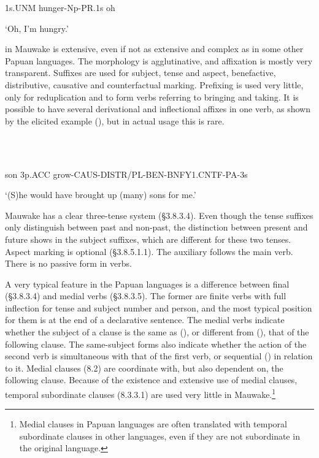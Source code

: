 1s.UNM  hunger-Np-PR.1s  oh

`Oh, I'm hungry.'

 in Mauwake is extensive, even if not as extensive and complex as in some other Papuan languages. The morphology is agglutinative, and  affixation is mostly very transparent.  Suffixes are used for subject, tense and aspect, benefactive, distributive, causative and counterfactual marking. Prefixing is used very little, only for reduplication and to form verbs referring to bringing and taking. It is possible to have several derivational and inflectional affixes in one verb, as shown by the elicited example (), but in actual usage this is rare.

\ea%
\label{ex:x664}
\gll {}  \\
      \\
\glt
\z

son  3p.ACC  grow-CAUS-DISTR/PL-BEN-BNFY1.CNTF-PA-3s

`(S)he would have brought up (many) sons for me.'

Mauwake has a clear three-tense system ({\S}3.8.3.4). Even though the tense suffixes only distinguish between past and non-past, the distinction between present and future shows in the subject suffixes, which are different for these two tenses.  Aspect marking is optional ({\S}3.8.5.1.1).  The auxiliary follows the main verb. There is no passive form in verbs.

A very typical feature in the Papuan languages is a difference between final ({\S}3.8.3.4) and medial verbs ({\S}3.8.3.5). The former are finite verbs with full inflection for tense and subject number and person, and the most typical position for them is at the end of a declarative sentence. The medial verbs indicate whether the subject of a clause is the same as (), or different from (), that of the following clause. The same-subject forms also indicate whether the action of the second verb is simultaneous with that of the first verb, or sequential () in relation to it. Medial clauses (8.2) are coordinate with, but also dependent on, the following clause. Because of the existence and extensive use of medial clauses, temporal subordinate clauses (8.3.3.1) are used very little in Mauwake.\footnote{Medial clauses in Papuan languages are often translated with temporal subordinate clauses in other languages, even if they are not subordinate in the original language.}

